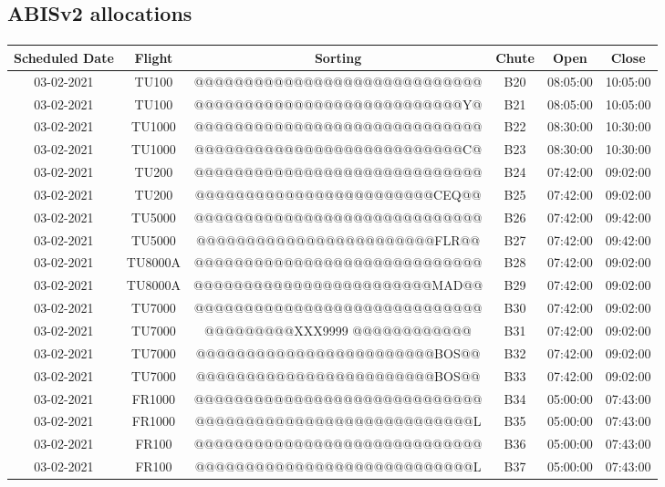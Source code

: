 \documentclass{report}
\begin{document}
\subsection*{ABISv2 allocations}
\paragraph{}
\begin{longtable}{cccccc}    \toprule
\rowcolor{white!50}
\textbf{Scheduled Date} & \textbf{Flight} & \textbf{Sorting} & \textbf{Chute} & \textbf{Open} & \textbf{Close} \\\midrule
\rowcolors{2}{gray!25}{white}
03-02-2021 & TU100 & @@@@@@@@@@@@@@@@@@@@@@@@@@@@@ & B20 & 08:05:00 & 10:05:00\\
03-02-2021 & TU100 & @@@@@@@@@@@@@@@@@@@@@@@@@@@Y@ & B21 & 08:05:00 & 10:05:00\\
03-02-2021 & TU1000 & @@@@@@@@@@@@@@@@@@@@@@@@@@@@@ & B22 & 08:30:00 & 10:30:00\\
03-02-2021 & TU1000 & @@@@@@@@@@@@@@@@@@@@@@@@@@@C@ & B23 & 08:30:00 & 10:30:00\\
03-02-2021 & TU200 & @@@@@@@@@@@@@@@@@@@@@@@@@@@@@ & B24 & 07:42:00 & 09:02:00\\
03-02-2021 & TU200 & @@@@@@@@@@@@@@@@@@@@@@@@CEQ@@ & B25 & 07:42:00 & 09:02:00\\
03-02-2021 & TU5000 & @@@@@@@@@@@@@@@@@@@@@@@@@@@@@ & B26 & 07:42:00 & 09:42:00\\
03-02-2021 & TU5000 & @@@@@@@@@@@@@@@@@@@@@@@@FLR@@ & B27 & 07:42:00 & 09:42:00\\
03-02-2021 & TU8000A & @@@@@@@@@@@@@@@@@@@@@@@@@@@@@ & B28 & 07:42:00 & 09:02:00\\
03-02-2021 & TU8000A & @@@@@@@@@@@@@@@@@@@@@@@@MAD@@ & B29 & 07:42:00 & 09:02:00\\
03-02-2021 & TU7000 & @@@@@@@@@@@@@@@@@@@@@@@@@@@@@ & B30 & 07:42:00 & 09:02:00\\
03-02-2021 & TU7000 & @@@@@@@@@XXX9999 @@@@@@@@@@@@ & B31 & 07:42:00 & 09:02:00\\
03-02-2021 & TU7000 & @@@@@@@@@@@@@@@@@@@@@@@@BOS@@ & B32 & 07:42:00 & 09:02:00\\
03-02-2021 & TU7000 & @@@@@@@@@@@@@@@@@@@@@@@@BOS@@ & B33 & 07:42:00 & 09:02:00\\
03-02-2021 & FR1000 & @@@@@@@@@@@@@@@@@@@@@@@@@@@@@ & B34 & 05:00:00 & 07:43:00\\
03-02-2021 & FR1000 & @@@@@@@@@@@@@@@@@@@@@@@@@@@@L & B35 & 05:00:00 & 07:43:00\\
03-02-2021 & FR100 & @@@@@@@@@@@@@@@@@@@@@@@@@@@@@ & B36 & 05:00:00 & 07:43:00\\
03-02-2021 & FR100 & @@@@@@@@@@@@@@@@@@@@@@@@@@@@L & B37 & 05:00:00 & 07:43:00\\
\bottomrule
\end{longtable}
\end{document}

